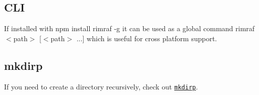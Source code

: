 \subsection*{C\+L\+I}

If installed with {\ttfamily npm install rimraf -\/g} it can be used as a global command {\ttfamily rimraf $<$path$>$ \mbox{[}$<$path$>$ ...\mbox{]}} which is useful for cross platform support.

\subsection*{mkdirp}

If you need to create a directory recursively, check out \href{https://github.com/substack/node-mkdirp}{\tt mkdirp}. 
